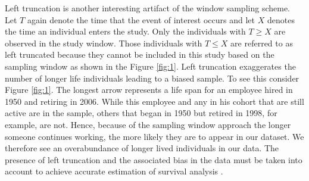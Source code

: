 \documentclass[12pt,letterpaper]{article}
\begin{document}
 Left truncation is another interesting artifact of the window sampling scheme. Let $T$ again denote the time that the event of interest occurs and let $X$ denotes the time an individual enters the study. Only the individuals with $T \geq X$ are observed in the study window. Those individuals with $T \leq X$ are referred to as left truncated because they cannot be included in this study based on the sampling window as shown in the Figure \ref{fig:1}. Left truncation exaggerates the number of longer life individuals leading to a biased sample. To see this consider Figure \ref{fig:1}. The longest arrow represents a life span for an employee hired in 1950 and retiring in 2006. While this employee and any in his cohort that are still active are in the sample, others that began in 1950 but retired in 1998, for example, are not. Hence, because of the sampling window approach the longer someone continues working, the more likely they are to appear in our dataset.  We therefore see an overabundance of longer lived individuals in our data.  The presence of left truncation and the associated bias in the data must be taken into account to achieve accurate estimation of survival analysis \citep{carrion2010}.


\end{document}
